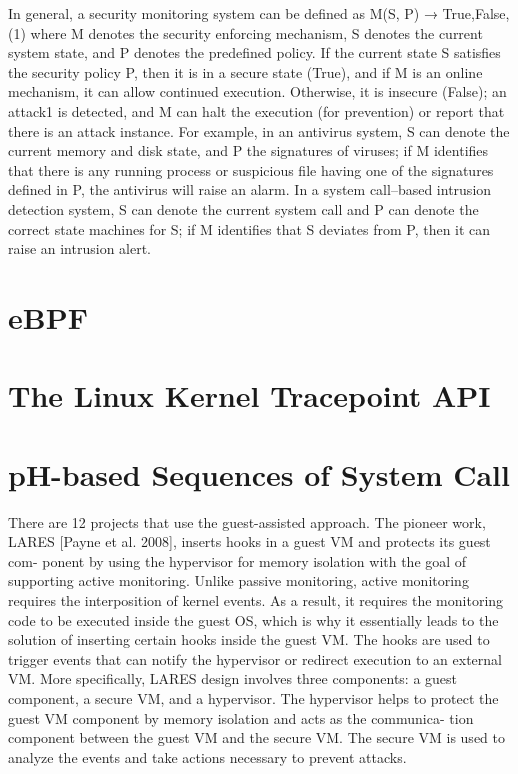 \documentclass{report}
\begin{document}
\begin{spacing}{1.5}
In general, a security monitoring system can be defined as
M(S, P) → {True,False}, (1)
where M denotes the security enforcing mechanism, S denotes the current system
state, and P denotes the predefined policy. If the current state S satisfies the security
policy P, then it is in a secure state (True), and if M is an online mechanism, it can
allow continued execution. Otherwise, it is insecure (False); an attack1 is detected, and
M can halt the execution (for prevention) or report that there is an attack instance.
For example, in an antivirus system, S can denote the current memory and disk state,
and P the signatures of viruses; if M identifies that there is any running process or
suspicious file having one of the signatures defined in P, the antivirus will raise an
alarm. In a system call–based intrusion detection system, S can denote the current
system call and P can denote the correct state machines for S; if M identifies that
S deviates from P, then it can raise an intrusion alert.


\section{eBPF}
\section{The Linux Kernel Tracepoint API}
\section{pH-based Sequences of System Call}



{\large


There are 12 projects that use the guest-assisted approach. The pioneer
work, LARES [Payne et al. 2008], inserts hooks in a guest VM and protects its guest com-
ponent by using the hypervisor for memory isolation with the goal of supporting active
monitoring. Unlike passive monitoring, active monitoring requires the interposition of kernel events. As a result, it requires the monitoring code to be executed inside the guest OS, which is why it essentially leads to the solution of inserting certain hooks inside the guest VM. The hooks are used to trigger events that can notify the hypervisor
or redirect execution to an external VM. More specifically, LARES design involves three
components: a guest component, a secure VM, and a hypervisor. The hypervisor helps
to protect the guest VM component by memory isolation and acts as the communica-
tion component between the guest VM and the secure VM. The secure VM is used to
analyze the events and take actions necessary to prevent attacks.


}
\end{spacing}
\end{document}
